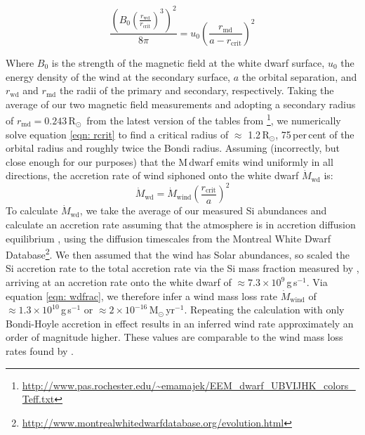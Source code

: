 \documentclass[fleqn,usenatbib]{mnras}
\newcommand{\Msun}{\mbox{$\mathrm{M}_{\odot}$}}
\newcommand{\Rsun}{\mbox{$\mathrm{R}_{\odot}$}}
\begin{document}
\newcommand{\D}{\displaystyle}
\begin{equation}
    \label{eqn: rcrit}
\frac{\left(B_0 \left(\frac{\D r_{\mathrm{wd}}}{\D r_{\mathrm{crit}}}\right)^3\right)^2}{8\pi} = u_0\left(\frac{r_{\mathrm{md}}}{a-r_{\mathrm{crit}}}\right)^2 
\end{equation}

Where $B_0$ is the strength of the magnetic field at the white dwarf surface, $u_0$ the energy density of the wind at the secondary surface, $a$ the orbital separation, and $r_{\mathrm{wd}}$ and $r_{\mathrm{md}}$ the radii of the primary and secondary, respectively. Taking the average of our two magnetic field measurements and adopting a secondary radius of $r_{\mathrm{md}}=0.243$\,\Rsun\ from the latest version of the tables from \citet{pecaut+mamajek13-1}\footnote{\url{http://www.pas.rochester.edu/~emamajek/EEM_dwarf_UBVIJHK_colors_Teff.txt}}, we numerically solve equation \ref{eqn: rcrit} to find a critical radius of $\approx$ 1.2\,\Rsun, 75\,per\,cent of the orbital radius and roughly twice the Bondi radius. Assuming (incorrectly, but close enough for our purposes) that the M\,dwarf emits wind uniformly in all directions, the accretion rate of wind siphoned onto the white dwarf $\dot{M}_{\mathrm{wd}}$ is:
\begin{equation}
    \label{eqn: wdfrac}
\dot{M}_{\mathrm{wd}} = \dot{M}_{\mathrm{wind}} \left(\frac{r_{\mathrm{crit}}}{a}\right)^2      
\end{equation}
To calculate $\dot{M}_{\mathrm{wd}}$, we take the average of our measured Si abundances and calculate an accretion rate assuming that the atmosphere is in accretion diffusion equilibrium \citep{koester10-1}, using the diffusion timescales from the Montreal White Dwarf Database\footnote{\url{http://www.montrealwhitedwarfdatabase.org/evolution.html}}. We then assumed that the wind has Solar abundances, so scaled the Si accretion rate to the total accretion rate via the Si mass fraction measured by \citet{asplundetal09-1}, arriving at an accretion rate onto the white dwarf of $\approx7.3\times10^9$\,g\,s$^{-1}$. Via equation \ref{eqn: wdfrac}, we therefore infer a wind mass loss rate $\dot{M}_{\mathrm{wind}}$ of $\approx1.3\times10^{10}$\,g\,s$^{-1}$ or $\approx2\times10^{-16}$\,\Msun\,yr$^{-1}$. Repeating the calculation with only Bondi-Hoyle accretion in effect results in an inferred wind rate approximately an order of magnitude higher. These values are comparable to the wind mass loss rates found by \citep{debes06-1}.
\end{document}
